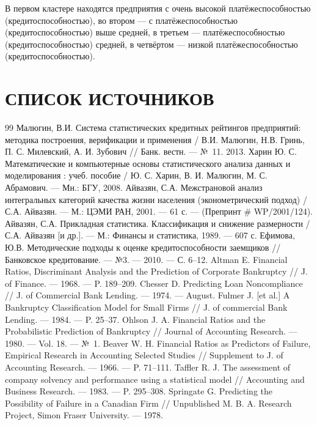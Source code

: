 \documentclass[14pt,a4paper]{extarticle}
\begin{document}
В первом кластере находятся предприятия с очень высокой платёжеспособностью (кредитоспособностью), во втором --- с платёжеспособностью (кредитоспособностью) выше средней, в третьем --- платёжеспособностью (кредитоспособностью) средней, в четвёртом --- низкой платёжеспособностью (кредитоспособностью).

\clearpage

\section*{СПИСОК ИСТОЧНИКОВ}

\begin{thebibliography}{99}
 Малюгин, В.И. Система статистических кредитных рейтингов предприятий: методика построения, верификации и применения / В.И. Малюгин, Н.В. Гринь, П. С. Милевский, А. И. Зубович // Банк. вестн. --- №~11. 2013.
 Харин Ю. С. Математические и компьютерные основы статистического анализа данных и моделирования : учеб. пособие / Ю. С. Харин, В. И. Малюгин, М. С. Абрамович. --- Мн.: БГУ, 2008.
 Айвазян, С.А. Межстрановой анализ интегральных категорий качества жизни населения (эконометрический подход) / С.А. Айвазян. --- М.: ЦЭМИ РАН, 2001. --- 61 с. --- (Препринт \# WP/2001/124).
 Айвазян, С.А. Прикладная статистика. Классификация и снижение размерности / С.А. Айвазян [и др.]. --- М.: Финансы и статистика, 1989. --- 607 с.
 Ефимова, Ю.В. Методические подходы к оценке кредитоспособности заемщиков // Банковское кредитование. --- №3. --- 2010. --- С. 6--12.
 Altman E. Financial Ratios, Discriminant Analysis and the Prediction of Corporate Bankruptcy // J. of Finance. --- 1968. --- P. 189--209.
 Chesser D. Predicting Loan Noncompliance // J. of Commercial Bank Lending. --- 1974. --- August.
 Fulmer J. [et al.] A Bankruptcy Classification Model for Small Firms // J. of commercial Bank Lending. --- 1984. --- P. 25--37.
 Ohlson J. A. Financial Ratios and the Probabilistic Prediction of Bankruptcy // Journal of Accounting Research. --- 1980. --- Vol. 18. --- №~1.
 Beaver W. H. Financial Ratios as Predictors of Failure, Empirical Research in Accounting Selected Studies // Supplement to J. of Accounting Research. --- 1966. --- P. 71--111.
 Taffler R. J. The assessment of company solvency and performance using a statistical model // Accounting and Business Research. --- 1983. --- P. 295--308.
 Springate G. Predicting the Possibility of Failure in a Canadian Firm // Unpublished M. B. A. Research Project, Simon Fraser University. --- 1978.

\end{thebibliography}
\end{document}
